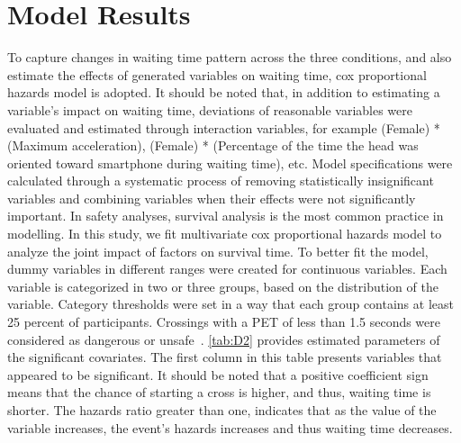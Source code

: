 \section{Model Results}
\label{S:D6}
To capture changes in waiting time pattern across the three conditions, and also estimate the effects of generated variables on waiting time, cox proportional hazards model is adopted. It should be noted that, in addition to estimating a variable’s impact on waiting time, deviations of reasonable variables were evaluated and estimated through interaction variables, for example (Female) * (Maximum acceleration), (Female) * (Percentage of the time the head was oriented toward smartphone during waiting time), etc. Model specifications were calculated through a systematic process of removing statistically insignificant variables and combining variables when their effects were not significantly important. In safety analyses, survival analysis is the most common practice in modelling. In this study, we fit multivariate cox proportional hazards model to analyze the joint impact of factors on survival time. To better fit the model, dummy variables in different ranges were created for continuous variables. Each variable is categorized in two or three groups, based on the distribution of the variable. Category thresholds were set in a way that each group contains at least 25 percent of participants. Crossings with a PET of less than 1.5 seconds were considered as dangerous or unsafe~\cite{zaki2016exploring}. \cref{tab:D2} provides estimated parameters of the significant covariates. The first column in this table presents variables that appeared to be significant. It should be noted that a positive coefficient sign means that the chance of starting a cross is higher, and thus, waiting time is shorter. The hazards ratio greater than one, indicates that as the value of the variable increases, the event’s hazards increases and thus waiting time decreases.

